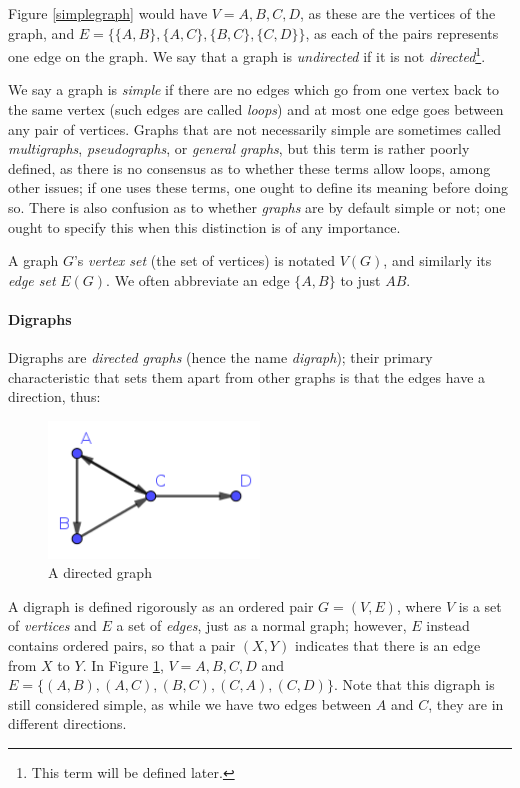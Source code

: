 \documentclass[11pt,a4paper]{report}
\begin{document}
\begin{adjustwidth}{5cm}{5cm}
Figure \ref{simplegraph} would have \(V={A,B,C,D}\), as these are the vertices of the graph, and \(E=\{\{A,B\},\{A,C\},\{B,C\},\{C,D\}\}\), as each of the pairs represents one edge on the graph. We say that a graph is \textit{undirected} if it is not \textit{directed}\footnote{This term will be defined later.\label{definedlater}}.

We say a graph is \textit{simple} if there are no edges which go from one vertex back to the same vertex (such edges are called \textit{loops}) and at most one edge goes between any pair of vertices. Graphs that are not necessarily simple are sometimes called \textit{multigraphs}, \textit{pseudographs}, or \textit{general graphs}, but this term is rather poorly defined, as there is no consensus as to whether these terms allow loops, among other issues; if one uses these terms, one ought to define its meaning before doing so. There is also confusion as to whether \textit{graphs} are by default simple or not; one ought to specify this when this distinction is of any importance.

A graph \(G\)'s \textit{vertex set} (the set of vertices) is notated \(V(G)\), and similarly its \textit{edge set} \(E(G)\). We often abbreviate an edge \(\{A,B\}\) to just \(AB\).

\paragraph{Digraphs}

Digraphs are \textit{directed graphs} (hence the name \textit{digraph}); their primary characteristic that sets them apart from other graphs is that the edges have a direction, thus:

\begin{figure}[h]
	\centering
	\includegraphics[width=0.5\textwidth]{directedgraph}
	\caption{A directed graph}
	\label{directedgraph}
\end{figure}

A digraph is defined rigorously as an ordered pair \(G=(V,E)\), where \(V\) is a set of \textit{vertices} and \(E\) a set of \textit{edges}, just as a normal graph; however, \(E\) instead contains ordered pairs, so that a pair \((X,Y)\) indicates that there is an edge from \(X\) to \(Y\). In Figure \ref{directedgraph}, \(V={A,B,C,D}\) and \(E=\{(A,B),(A,C),(B,C),(C,A),(C,D)\}\). Note that this digraph is still considered simple, as while we have two edges between \(A\) and \(C\), they are in different directions.


\end{adjustwidth}
\end{document}
